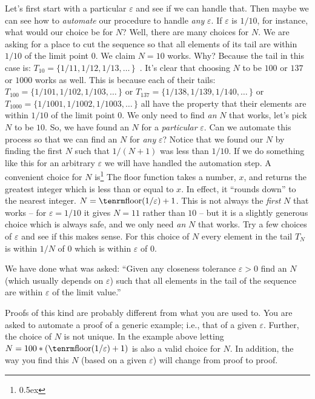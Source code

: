 Let's first start with a particular $\varepsilon$ and see if we can handle that.
Then maybe we can see how to {\it automate\/} our procedure to handle 
{\it any\/} $\varepsilon$. If $\varepsilon$ is $1/10$, for instance, what would 
our choice be for $N$? Well, there are many choices for $N$. We are asking for a 
place to cut the sequence so that all elements of its tail are within $1/10$ 
of the limit point $0$.
We claim $N = 10$ works. Why? Because the tail in this case is:
$T_{10} = \{1/11, 1/12, 1/13, 
\ldots\,\}\!\!$~. It's clear that choosing $N$ to be $100$ or $137$ or 
$1000$ works as well.
This is because each of their tails: $T_{100} = \{1/101, 1/102, 1/103, \ldots\,\}$ or
$T_{137} = \{1/138, 1/139, 1/140, \ldots\,\}$ or
$T_{1000} = \{1/1001, 1/1002, 1/1003, \ldots\,\}$ all have the property that 
their elements are within $1/10$ of the limit point $0$. 
We only need to find {\it an\/} $N$ that works, 
let's pick $N$ to be $10$. So, we have found an $N$ for a {\it particular\/} 
$\varepsilon$. Can we automate this process so that we can
find an $N$ for {\it any\/} $\varepsilon$? Notice that we found our $N$ by
finding the first $N$ such that $1/(N+1)$ was less than $1/10$. If we do
something like this for an arbitrary $\varepsilon$ we will have handled the automation step.
A convenient choice for $N$ is\footnote{\kern 0.5pt \raise 0.5ex \hbox{\dag}}
{The floor function takes a number, $x$, and returns the greatest integer
which is less than or equal to $x$. In effect, it ``rounds down''
to the nearest integer.}
$N = {\rm floor}(1 / \varepsilon) + 1$. This is not always the {\it first\/}
$N$ that works -- for $\varepsilon = 1/10$ it gives $N = 11$ rather than
$10$ -- but it is a slightly generous choice which is always safe, and we
only need {\it an\/} $N$ that works. Try a few choices of $\varepsilon$ and see
if this makes sense. For this choice of $N$ every element in the tail $T_N$
is within $1/N$ of $0$ which is within $\varepsilon$ of $0$.

We have done what 
was asked: \goodbreak ``Given any 
closeness tolerance $\varepsilon>0$ find an $N$ (which usually depends on $\varepsilon$) 
such that all elements in the tail of 
the sequence are within $\varepsilon$ of the limit value.''

Proofs of this kind are probably different from what you are used to.
You are asked to automate a proof of a generic example; i.e., that of a given
$\varepsilon$. Further, the choice of $N$ is not unique. In the example above 
letting $N =100 * ({\rm floor} (1 / \varepsilon) + 1)$
is also a 
valid choice for $N$.
In addition, the way you
find this $N$ (based on a given $\varepsilon$) will change from proof to proof. 

